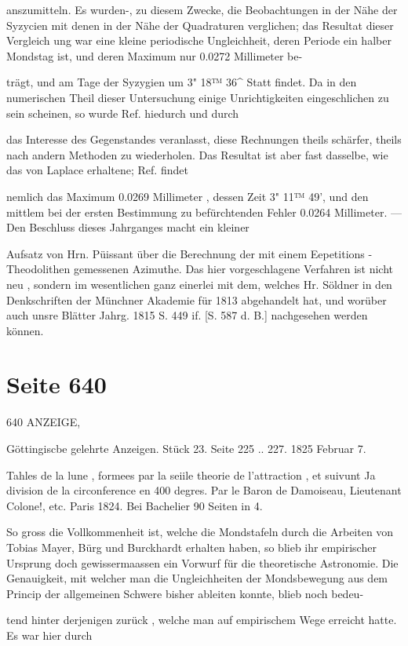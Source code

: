 \documentclass[10pt,a4paper]{article}
\begin{document}
anszumitteln. Es wurden-, zu diesem Zwecke, die Beobachtungen in der Nähe der Syzycien mit denen in der Nähe der Quadraturen verglichen; das Resultat dieser Vergleich ung war eine kleine periodische Ungleichheit, deren Periode ein halber Mondstag ist, und deren Maximum nur 0.0272 Millimeter be-

trägt, und am Tage der Syzygien um 3" 18™ 36\textasciicircum{} Statt findet. Da in den numerischen Theil dieser Untersuchung einige Unrichtigkeiten eingeschlichen zu sein scheinen, so wurde Ref. hiedurch und durch

das Interesse des Gegenstandes veranlasst, diese Rechnungen theils schärfer, theils nach andern Methoden zu wiederholen. Das Resultat ist aber fast dasselbe, wie das von Laplace erhaltene; Ref. findet

nemlich das Maximum 0.0269 Millimeter , dessen Zeit 3" 11™ 49', und den mittlem bei der ersten Bestimmung zu befürchtenden Fehler 0.0264 Millimeter. — Den Beschluss dieses Jahrganges macht ein kleiner

Aufsatz von Hrn. Püissant über die Berechnung der mit einem Eepetitions - Theodolithen gemessenen Azimuthe. Das hier vorgeschlagene Verfahren ist nicht neu , sondern im wesentlichen ganz einerlei mit dem, welches Hr. Söldner in den Denkschriften der Münchner Akademie für 1813 abgehandelt hat, und worüber auch unsre Blätter Jahrg. 1815 S. 449 if. [S. 587 d. B.] nachgesehen werden können.


\newpage
\section*{Seite 640}
640 ANZEIGE,

Göttingiscbe gelehrte Anzeigen. Stück 23. Seite 225 .. 227. 1825 Februar 7.

Tahles de la lune , formees par la seiile theorie de l'attraction , et suivunt Ja division de la circonference en 400 degres. Par le Baron de Damoiseau, Lieutenant Colone!, etc. Paris 1824. Bei Bachelier 90 Seiten in 4.

So gross die Vollkommenheit ist, welche die Mondstafeln durch die Arbeiten von Tobias Mayer, Bürg und Burckhardt erhalten haben, so blieb ihr empirischer Ursprung doch gewissermaassen ein Vorwurf für die theoretische Astronomie. Die Genauigkeit, mit welcher man die Ungleichheiten der Mondsbewegung aus dem Princip der allgemeinen Schwere bisher ableiten konnte, blieb noch bedeu-

tend hinter derjenigen zurück , welche man auf empirischem Wege erreicht hatte. Es war hier durch
\end{document}
